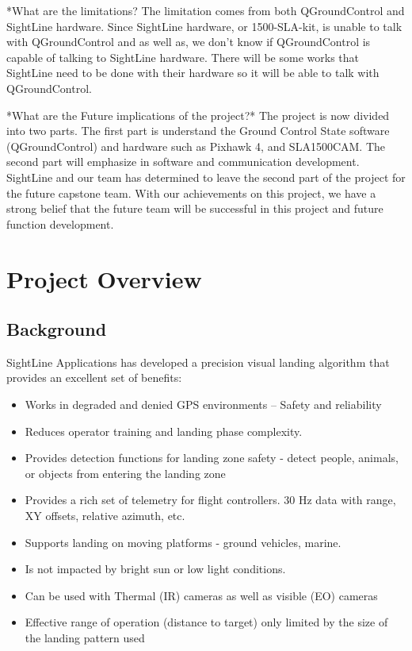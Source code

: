 \documentclass[11pt]{article}
\begin{document}
*What are the limitations?
The limitation comes from both QGroundControl and SightLine hardware. Since SightLine hardware, or 1500-SLA-kit, is unable to talk with QGroundControl and as well as, we don't know if QGroundControl is capable of talking to SightLine hardware. There will be some works that SightLine need to be done with their hardware  so it will be able to talk with QGroundControl.  

*What are the Future implications of the project?*
The project is now divided into two parts. The first part is understand the Ground Control State software (QGroundControl) and hardware  such as Pixhawk 4, and SLA1500CAM. The second part will emphasize in software and communication development. SightLine and our team has determined to leave the second part of the project for the future capstone team. With our achievements on this project, we have a strong belief that the future team will be successful in this project and future function development.

\pagebreak

\tableofcontents

\pagebreak

\listoffigures

\pagebreak

\section{Project Overview}
\subsection{Background}
SightLine Applications has developed a precision visual landing algorithm that provides an excellent set of benefits:
\begin{itemize}
\item Works in degraded and denied GPS environments – Safety and reliability
\item	Reduces operator training and landing phase complexity.
\item	Provides detection functions for landing zone safety - detect people, animals, or objects from entering the landing zone
\item   Provides a rich set of telemetry for flight controllers.  30 Hz data with range, XY offsets, relative azimuth, etc.
\item	Supports landing on moving platforms - ground vehicles, marine.
\item	Is not impacted by bright sun or low light conditions.
\item	Can be used with Thermal (IR) cameras as well as visible (EO) cameras
\item	Effective range of operation (distance to target) only limited by the size of the landing pattern used
\end{itemize}
\end{document}
